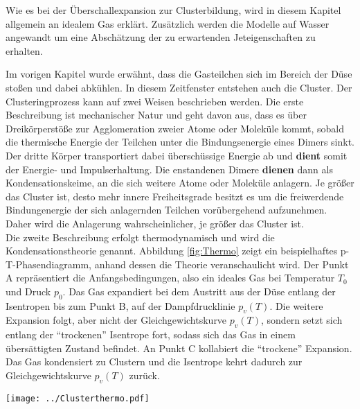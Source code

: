 Wie es bei der Überschallexpansion zur Clusterbildung, wird in diesem Kapitel allgemein an idealem Gas erklärt. Zusätzlich werden die Modelle auf Wasser angewandt um eine Abschätzung der zu erwartenden Jeteigenschaften zu erhalten.

Im vorigen Kapitel wurde erwähnt, dass die Gasteilchen sich im Bereich der Düse stoßen und dabei abkühlen. In diesem Zeitfenster entstehen auch die Cluster. Der Clusteringprozess kann auf zwei Weisen beschrieben werden. Die erste Beschreibung ist mechanischer Natur und geht davon aus, dass es über Dreikörperstöße zur Agglomeration zweier Atome oder Moleküle kommt, sobald die thermische Energie der Teilchen unter die Bindungsenergie eines Dimers sinkt. Der dritte Körper transportiert dabei überschüssige Energie ab und \textbf{dient} somit der Energie- und Impulserhaltung. Die enstandenen Dimere \textbf{dienen} dann als Kondensationskeime, an die sich weitere Atome oder Moleküle anlagern. Je größer das Cluster ist, desto mehr innere Freiheitsgrade besitzt es um die freiwerdende Bindungenergie der sich anlagernden Teilchen vorübergehend aufzunehmen. Daher wird die Anlagerung wahrscheinlicher, je größer das Cluster ist. \cite{dreikcluster05} \\
Die zweite Beschreibung erfolgt thermodynamisch und wird die Kondensationstheorie genannt. 
Abbildung \ref{fig:Thermo} zeigt ein beispielhaftes p-T-Phasendiagramm, anhand dessen die Theorie veranschaulicht wird. Der Punkt A repräsentiert die Anfangsbedingungen, also ein ideales Gas bei Temperatur $T_0$ und Druck $p_0$. Das Gas expandiert bei dem Austritt aus der Düse entlang der Isentropen bis zum Punkt B, auf der Dampfdrucklinie $p_v(T)$. Die weitere Expansion folgt, aber nicht der Gleichgewichtskurve $p_v(T)$, sondern setzt sich entlang der \enquote{trockenen} Isentrope fort, sodass sich das Gas in einem übersättigten Zustand befindet. An Punkt C kollabiert die \enquote{trockene} Expansion. Das Gas kondensiert zu Clustern und die Isentrope kehrt dadurch zur Gleichgewichtskurve $p_v(T)$ zurück. \cite{hagena1981nucleation}

\begin{center}
\begin{minipage}{\linewidth}
\centering
\texttt{[image: ../Clusterthermo.pdf]}%
 \label{fig:Thermo}
\end{minipage} 
\end{center}

